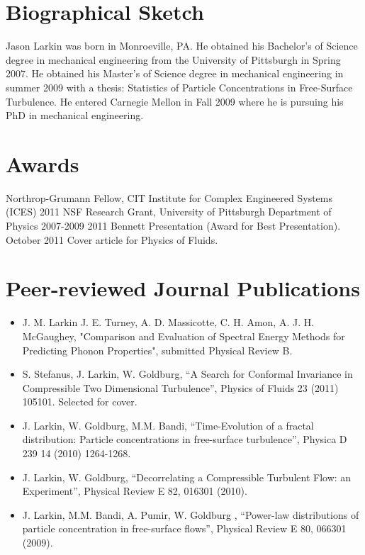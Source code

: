 \documentclass[letterpaper,12pt]{article}
\begin{document}
\section{Biographical Sketch} 
Jason Larkin was born in Monroeville, PA. He obtained his Bachelor's of Science degree
in mechanical engineering from the University of Pittsburgh in
Spring 2007. He obtained his Master's of Science degree in mechanical engineering in summer 2009 with a thesis: Statistics of Particle Concentrations in Free-Surface Turbulence. He entered Carnegie Mellon in Fall 2009 where he is pursuing his PhD in mechanical engineering.
\section*{\label{S-awards}Awards}
Northrop-Grumann Fellow, CIT Institute for Complex Engineered Systems (ICES) 2011
NSF Research Grant, University of Pittsburgh Department of Physics 2007-2009
2011 Bennett Presentation (Award for Best Presentation).
October 2011 Cover article for Physics of Fluids.
\section*{Peer-reviewed Journal Publications}
\begin{itemize}
\item J. M. Larkin J. E. Turney, A. D. Massicotte, C. H. Amon, A. J. H. McGaughey, "Comparison and Evaluation of Spectral Energy Methods for Predicting Phonon Properties", submitted Physical Review B.
\item S. Stefanus, J. Larkin, W. Goldburg, “A Search for Conformal Invariance in Compressible Two
Dimensional Turbulence”, Physics of Fluids 23 (2011) 105101. Selected for cover.
\item J. Larkin, W. Goldburg, M.M. Bandi, “Time-Evolution of a fractal distribution: Particle concentrations
in free-surface turbulence”, Physica D 239 14 (2010) 1264-1268.
\item J. Larkin, W. Goldburg, “Decorrelating a Compressible Turbulent Flow: an Experiment”, Physical Review E
82, 016301 (2010).
\item J. Larkin, M.M. Bandi, A. Pumir, W. Goldburg , “Power-law distributions of particle concentration in
free-surface flows”, Physical Review E 80, 066301 (2009).
\end{itemize}
\end{document}
